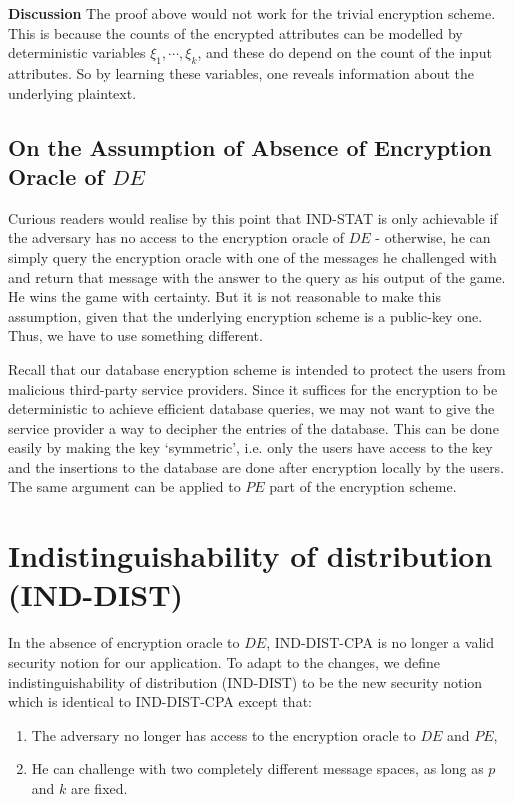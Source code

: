 \textbf{Discussion} The proof above would not work for the trivial encryption scheme. This is because the counts of the encrypted attributes can be modelled by deterministic variables $\xi_1, \cdots, \xi_k$, and these do depend on the count of the input attributes. So by learning these variables, one reveals information about the underlying plaintext.




\subsection{On the Assumption of Absence of Encryption Oracle of $DE$}
Curious readers would realise by this point that IND-STAT is only achievable if the adversary has no access to the encryption oracle of $DE$ - otherwise, he can simply query the encryption oracle with one of the messages he challenged with and return that message with the answer to the query as his output of the game. He wins the game with certainty. But it is not reasonable to make this assumption, given that the underlying encryption scheme is a public-key one. Thus, we have to use something different.

Recall that our database encryption scheme is intended to protect the users from malicious third-party service providers. Since it suffices for the encryption to be deterministic to achieve efficient database queries, we may not want to give the service provider a way to decipher the entries of the database. This can be done easily by making the key `symmetric', i.e. only the users have access to the key and the insertions to the database are done after encryption locally by the users. The same argument can be applied to $PE$ part of the encryption scheme.




\section{Indistinguishability of distribution (IND-DIST)}
In the absence of encryption oracle to $DE$, IND-DIST-CPA is no longer a valid security notion for our application. To adapt to the changes, we define indistinguishability of distribution (IND-DIST) to be the new security notion which is identical to IND-DIST-CPA except that:
\begin{enumerate}
\item The adversary no longer has access to the encryption oracle to $DE$ and $PE$,
\item He can challenge with two completely different message spaces, as long as $p$ and $k$ are fixed.
\end{enumerate}

